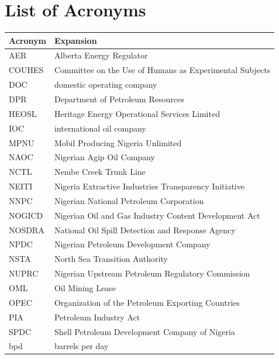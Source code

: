 \chapter*{List of Acronyms}
\begin{longtable}{@{}ll@{}}
\textbf{Acronym} & \textbf{Expansion}\\
\hline
AER & Alberta Energy Regulator\\
COUHES & Committee on the Use of Humans as Experimental Subjects\\
DOC & domestic operating company\\
DPR & Department of Petroleum Resources\\
HEOSL & Heritage Energy Operational Services Limited\\
IOC & international oil company\\
MPNU & Mobil Producing Nigeria Unlimited\\
NAOC & Nigerian Agip Oil Company\\
NCTL & Nembe Creek Trunk Line\\
NEITI & Nigeria Extractive Industries Transparency Initiative\\
NNPC & Nigerian National Petroleum Corporation\\
NOGICD & Nigerian Oil and Gas Industry Content Development Act\\
NOSDRA & National Oil Spill Detection and Response Agency\\
NPDC & Nigerian Petroleum Development Company\\
NSTA & North Sea Transition Authority\\
NUPRC & Nigerian Upstream Petroleum Regulatory Commission\\
OML & Oil Mining Lease\\
OPEC & Organization of the Petroleum Exporting Countries\\
PIA & Petroleum Industry Act\\
SPDC & Shell Petroleum Development Company of Nigeria\\
bpd & barrels per day\\
\end{longtable}
